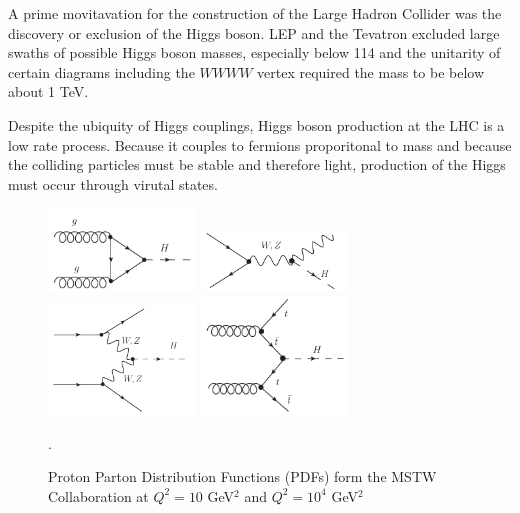 %

%
A prime movitavation for the construction of the Large Hadron Collider was the
discovery or exclusion of the Higgs boson. LEP and the Tevatron excluded large
swaths of possible Higgs boson masses, especially below 114 \gevcc and the
unitarity of certain diagrams including the $WWWW$ vertex required the mass to
be below about 1 TeV. 

Despite the ubiquity of Higgs couplings, Higgs boson production at the LHC is a
low rate process. Because it couples to fermions proporitonal to mass and
because the colliding particles must be stable and therefore light, production
of the Higgs must occur through virutal states. 

\begin{figure}[!t]
\centering 
\includegraphics[width=0.35\textwidth]{figs/ggF.pdf}
\includegraphics[width=0.35\textwidth]{figs/vh.pdf}
\includegraphics[width=0.35\textwidth]{figs/vbf.pdf}
\includegraphics[width=0.35\textwidth]{figs/tth.pdf}
\caption {Proton Parton Distribution Functions (PDFs) form the MSTW Collaboration at $Q^2 = 10$ GeV$^2$ and $Q^2 = 10^4$ GeV$^2$}.
\label{figure:theory_higgsdiagrams}
\end{figure}


